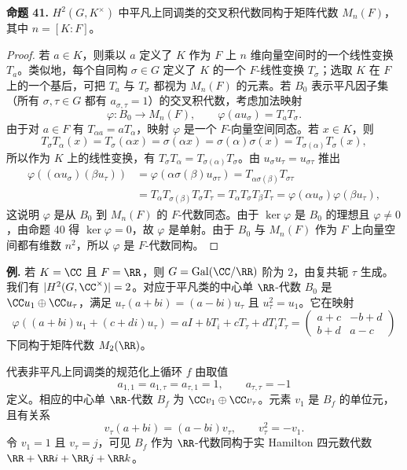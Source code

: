 \medskip
\noindent\textbf{命题 41.} $H^2(G,K^\times)$ 中平凡上同调类的交叉积代数同构于矩阵代数 $M_n(F)$，其中 $n=[K:F]$。

\begin{proof}
若 $a\in K$，则乘以 $a$ 定义了 $K$ 作为 $F$ 上 $n$ 维向量空间时的一个线性变换 $T_a$。类似地，每个自同构 $\sigma\in G$ 定义了 $K$ 的一个 $F$-线性变换 $T_\sigma$；选取 $K$ 在 $F$ 上的一个基后，可把 $T_a$ 与 $T_\sigma$ 都视为 $M_n(F)$ 的元素。若 $B_0$ 表示平凡因子集（所有 $\sigma,\tau\in G$ 都有 $a_{\sigma,\tau}=1$）的交叉积代数，考虑加法映射
\[
  \varphi:B_0\to M_n(F),\qquad \varphi(a u_\sigma)=T_aT_\sigma.
\]
由于对 $a\in F$ 有 $T_{\alpha a}=aT_\alpha$，映射 $\varphi$ 是一个 $F$-向量空间同态。若 $x\in K$，则
\[
  T_\sigma T_\alpha(x)=T_\sigma(\alpha x)=\sigma(\alpha x)=\sigma(\alpha)\sigma(x)=T_{\sigma(\alpha)}T_\sigma(x),
\]
所以作为 $K$ 上的线性变换，有 $T_\sigma T_\alpha=T_{\sigma(\alpha)}T_\sigma$。由 $u_\sigma u_\tau=u_{\sigma\tau}$ 推出
\[
\begin{aligned}
  \varphi((\alpha u_\sigma)(\beta u_\tau))
  &=\varphi(\alpha\sigma(\beta)u_{\sigma\tau})
    =T_{\alpha\sigma(\beta)}T_{\sigma\tau}\\
  &=T_\alpha T_{\sigma(\beta)}T_\sigma T_\tau
    =T_\alpha T_\sigma T_\beta T_\tau
    =\varphi(\alpha u_\sigma)\varphi(\beta u_\tau),
\end{aligned}
\]
这说明 $\varphi$ 是从 $B_0$ 到 $M_n(F)$ 的 $F$-代数同态。由于 $\ker\varphi$ 是 $B_0$ 的理想且 $\varphi\neq0$，由命题 40 得 $\ker\varphi=0$，故 $\varphi$ 是单射。由于 $B_0$ 与 $M_n(F)$ 作为 $F$ 上向量空间都有维数 $n^2$，所以 $\varphi$ 是 $F$-代数同构。
\end{proof}

\noindent\textbf{例.} 若 $K=\CC$ 且 $F=\RR$，则 $G=\operatorname{Gal}(\CC/\RR)$ 阶为 $2$，由复共轭 $\tau$ 生成。我们有 $|H^2(G,\CC^\times)|=2$。对应于平凡类的中心单 $\RR$-代数 $B_0$ 是 $\CC u_1\oplus\CC u_\tau$，满足 $u_\tau(a+bi)=(a-bi)u_\tau$ 且 $u_\tau^2=u_1$。它在映射
\[
  \varphi((a+bi)u_1+(c+di)u_\tau)
  =aI+bT_i+cT_\tau+dT_iT_\tau
  =\begin{pmatrix}a+c&-b+d\\ b+d&a-c\end{pmatrix}
\]
下同构于矩阵代数 $M_2(\RR)$。

代表非平凡上同调类的规范化上循环 $f$ 由取值
\[
  a_{1,1}=a_{1,\tau}=a_{\tau,1}=1,
  \qquad a_{\tau,\tau}=-1
\]
定义。相应的中心单 $\RR$-代数 $B_f$ 为 $\CC v_1\oplus\CC v_\tau$。元素 $v_1$ 是 $B_f$ 的单位元，且有关系
\[
  v_\tau(a+bi)=(a-bi)v_\tau,
  \qquad v_\tau^2=-v_1.
\]
令 $v_1=1$ 且 $v_\tau=j$，可见 $B_f$ 作为 $\RR$-代数同构于实 Hamilton 四元数代数 $\RR+\RR i+\RR j+\RR k$。

